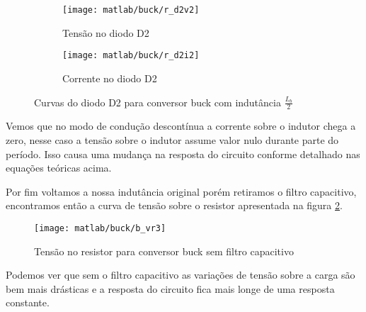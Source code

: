 \documentclass{article}
\begin{document}
\begin{figure}[H]
	\centering
	\begin{subfigure}[b]{0.4\linewidth}
		\texttt{[image: matlab/buck/r\_d2v2]}
		\caption{Tensão no diodo D2}
	\end{subfigure}
	\begin{subfigure}[b]{0.4\linewidth}
		\centering
		\texttt{[image: matlab/buck/r\_d2i2]}
		\caption{Corrente no diodo D2}
	\end{subfigure}
	\caption{Curvas do diodo D2 para conversor buck com indutância $\frac{L_b}{2}$}
	\label{fig:bd22}
\end{figure}

Vemos que no modo de condução descontínua a corrente sobre o indutor chega a zero, nesse caso a tensão sobre o indutor assume valor nulo durante parte do período. Isso causa uma mudança na resposta do circuito conforme detalhado nas equações teóricas acima.

Por fim voltamos a nossa indutância original porém retiramos o filtro capacitivo, encontramos então a curva de tensão sobre o resistor apresentada na figura \ref{fig:br3}.
\begin{figure}[H]
	\centering
	\texttt{[image: matlab/buck/b\_vr3]}
	\caption{Tensão no resistor para conversor buck sem filtro capacitivo}
	\label{fig:br3}
\end{figure}

Podemos ver que sem o filtro capacitivo as variações de tensão sobre a carga são bem mais drásticas e a resposta do circuito fica mais longe de uma resposta constante.
\end{document}
